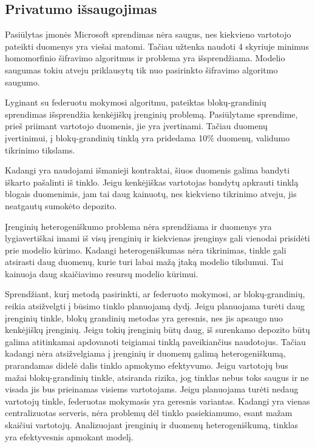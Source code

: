 \documentclass{VUMIFInfBakalaurinis}
\begin{document}
\subsection{Privatumo išsaugojimas}	
\par Pasiūlytas įmonės Microsoft sprendimas nėra saugus, nes kiekvieno vartotojo pateikti duomenys yra viešai matomi. Tačiau užtenka naudoti 4 skyriuje minimus homomorfinio šifravimo algoritmus ir problema yra išsprendžiama. Modelio saugumas tokiu atveju priklausytų tik nuo pasirinkto šifravimo algoritmo saugumo.
\par Lyginant su federuotu mokymosi algoritmu, pateiktas blokų-grandinių sprendimas išsprendžia kenkėjiškų įrenginių problemą. Pasiūlytame sprendime, prieš priimant vartotojo duomenis, jie yra įvertinami. Tačiau duomenų įvertinimui, į blokų-grandinių tinklą yra pridedama 10\% duomenų, validumo tikrinimo tikslams. \par Kadangi yra naudojami išmanieji kontraktai, šiuos duomenis galima bandyti iškarto pašalinti iš tinklo. Jeigu kenkėjiškas vartotojas bandytų apkrauti tinklą blogais duomenimis, jam tai daug kainuotų, nes kiekvieno tikrinimo atveju, jis neatgautų sumokėto depozito.
\par Įrenginių heterogeniškumo problema nėra sprendžiama ir duomenys yra lygiavertiškai imami iš visų įrenginių ir kiekvienas įrenginys gali vienodai prisidėti prie modelio kūrimo. Kadangi heterogeniškumas nėra tikrinimas, tinkle gali atsirasti daug duomenų, kurie turi labai mažą įtaką modelio tikslumui. Tai kainuoja daug skaičiavimo resursų modelio kūrimui.
\par Sprendžiant, kurį metodą pasirinkti, ar federuoto mokymosi, ar blokų-grandinių, reikia atsižvelgti į būsimo tinklo planuojamą dydį. Jeigu planuojama turėti daug įrenginių tinkle, blokų grandinių metodas yra geresnis, nes jis apsaugo nuo kenkėjiškų įrenginių. Jeigu tokių įrenginių būtų daug, iš surenkamo depozito būtų galima atitinkamai apdovanoti teigiamai tinklą paveikiančius naudotojus. Tačiau kadangi nėra atsižvelgiama į įrenginių ir duomenų galimą heterogeniškumą, prarandamas didelė dalis tinklo apmokymo efektyvumo. Jeigu vartotojų bus mažai blokų-grandinių tinkle, atsiranda rizika, jog tinklas nebus toks saugus ir ne visada jis bus prieinamas visiems vartotojams. Jeigu planuojama turėti nedaug vartotojų tinkle, federuotas mokymasis yra geresnis variantas. Kadangi yra vienas centralizuotas serveris, nėra problemų dėl tinklo pasiekiamumo, esant mažam skaičiui vartotojų. Analizuojant įrenginių ir duomenų heterogeniškumą, tinklas yra efektyvesnis apmokant modelį.  
\end{document}

